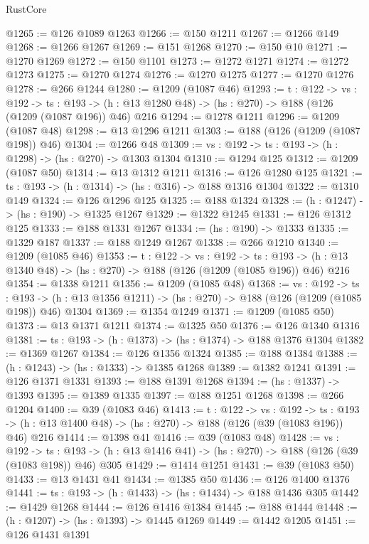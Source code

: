 \begin{lexlean}{RustCore}
\begin{coremodule}
@1265 := @126 @1089 @1263
@1266 := @150 @1211
@1267 := @1266 @149
@1268 := @1266 @1267
@1269 := @151 @1268
@1270 := @150 @10
@1271 := @1270 @1269
@1272 := @150 @1101
@1273 := @1272 @1271
@1274 := @1272 @1273
@1275 := @1270 @1274
@1276 := @1270 @1275
@1277 := @1270 @1276
@1278 := @266 @1244
@1280 := @1209 (@1087 @46)
@1293 := {t : @122} ->
  {vs : @192} ->
  {ts : @193} -> (h : @13 @1280 @48) -> (hs : @270) -> @188 (@126 (@1209 (@1087 @196)) @46) @216
@1294 := @1278 @1211
@1296 := @1209 (@1087 @48)
@1298 := @13 @1296 @1211
@1303 := @188 (@126 (@1209 (@1087 @198)) @46)
@1304 := @1266 @48
@1309 := {vs : @192} -> {ts : @193} -> (h : @1298) -> (hs : @270) -> @1303 @1304
@1310 := @1294 @125
@1312 := @1209 (@1087 @50)
@1314 := @13 @1312 @1211
@1316 := @126 @1280 @125
@1321 := {ts : @193} -> (h : @1314) -> (hs : @316) -> @188 @1316 @1304
@1322 := @1310 @149
@1324 := @126 @1296 @125
@1325 := @188 @1324
@1328 := (h : @1247) -> (hs : @190) -> @1325 @1267
@1329 := @1322 @1245
@1331 := @126 @1312 @125
@1333 := @188 @1331 @1267
@1334 := (hs : @190) -> @1333
@1335 := @1329 @187
@1337 := @188 @1249 @1267
@1338 := @266 @1210
@1340 := @1209 (@1085 @46)
@1353 := {t : @122} ->
  {vs : @192} ->
  {ts : @193} -> (h : @13 @1340 @48) -> (hs : @270) -> @188 (@126 (@1209 (@1085 @196)) @46) @216
@1354 := @1338 @1211
@1356 := @1209 (@1085 @48)
@1368 := {vs : @192} ->
  {ts : @193} -> (h : @13 @1356 @1211) -> (hs : @270) -> @188 (@126 (@1209 (@1085 @198)) @46) @1304
@1369 := @1354 @1249
@1371 := @1209 (@1085 @50)
@1373 := @13 @1371 @1211
@1374 := @1325 @50
@1376 := @126 @1340 @1316
@1381 := {ts : @193} -> (h : @1373) -> (hs : @1374) -> @188 @1376 @1304
@1382 := @1369 @1267
@1384 := @126 @1356 @1324
@1385 := @188 @1384
@1388 := (h : @1243) -> (hs : @1333) -> @1385 @1268
@1389 := @1382 @1241
@1391 := @126 @1371 @1331
@1393 := @188 @1391 @1268
@1394 := (hs : @1337) -> @1393
@1395 := @1389 @1335
@1397 := @188 @1251 @1268
@1398 := @266 @1204
@1400 := @39 (@1083 @46)
@1413 := {t : @122} ->
  {vs : @192} ->
  {ts : @193} -> (h : @13 @1400 @48) -> (hs : @270) -> @188 (@126 (@39 (@1083 @196)) @46) @216
@1414 := @1398 @41
@1416 := @39 (@1083 @48)
@1428 := {vs : @192} ->
  {ts : @193} -> (h : @13 @1416 @41) -> (hs : @270) -> @188 (@126 (@39 (@1083 @198)) @46) @305
@1429 := @1414 @1251
@1431 := @39 (@1083 @50)
@1433 := @13 @1431 @41
@1434 := @1385 @50
@1436 := @126 @1400 @1376
@1441 := {ts : @193} -> (h : @1433) -> (hs : @1434) -> @188 @1436 @305
@1442 := @1429 @1268
@1444 := @126 @1416 @1384
@1445 := @188 @1444
@1448 := (h : @1207) -> (hs : @1393) -> @1445 @1269
@1449 := @1442 @1205
@1451 := @126 @1431 @1391

\end{coremodule}
\end{lexlean}
